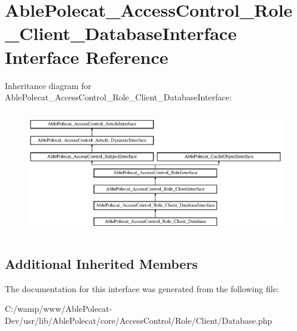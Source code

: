 \hypertarget{interface_able_polecat___access_control___role___client___database_interface}{}\section{Able\+Polecat\+\_\+\+Access\+Control\+\_\+\+Role\+\_\+\+Client\+\_\+\+Database\+Interface Interface Reference}
\label{interface_able_polecat___access_control___role___client___database_interface}
Inheritance diagram for Able\+Polecat\+\_\+\+Access\+Control\+\_\+\+Role\+\_\+\+Client\+\_\+\+Database\+Interface\+:\begin{figure}[H]
\begin{center}
\leavevmode
\includegraphics[height=5.459610cm]{interface_able_polecat___access_control___role___client___database_interface}
\end{center}
\end{figure}
\subsection*{Additional Inherited Members}


The documentation for this interface was generated from the following file\+:\begin{DoxyCompactItemize}
\item 
C\+:/wamp/www/\+Able\+Polecat-\/\+Dev/usr/lib/\+Able\+Polecat/core/\+Access\+Control/\+Role/\+Client/Database.\+php\end{DoxyCompactItemize}
